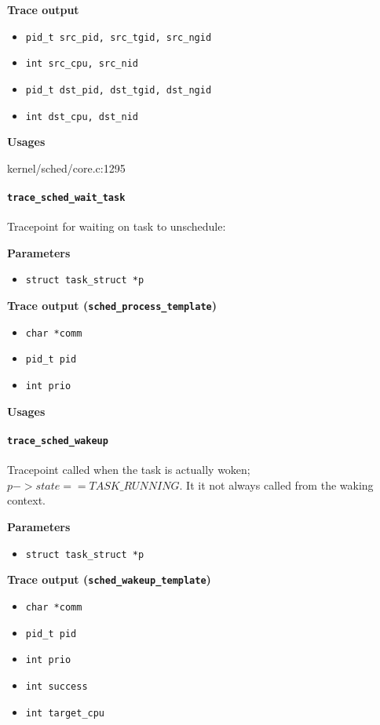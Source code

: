 \textbf{Trace output}
\begin{itemize}
    \item \verb|pid_t src_pid, src_tgid, src_ngid|
    \item \verb|int src_cpu, src_nid|
    \item \verb|pid_t dst_pid, dst_tgid, dst_ngid|
    \item \verb|int dst_cpu, dst_nid|
\end{itemize}

\textbf{Usages}
\begin{code}
kernel/sched/core.c:1295
\end{code}

\paragraph{\texttt{trace\_sched\_wait\_task}}
Tracepoint for waiting on task to unschedule:

\textbf{Parameters}
\begin{itemize}
    \item \verb|struct task_struct *p|
\end{itemize}

\textbf{Trace output (\texttt{sched\_process\_template})}
\begin{itemize}
    \item \verb|char *comm|
    \item \verb|pid_t pid|
    \item \verb|int prio|
\end{itemize}

\textbf{Usages}
\begin{code}

\end{code}

\paragraph{\texttt{trace\_sched\_wakeup}}
Tracepoint called when the task is actually woken; $p->state == TASK\_RUNNING$. It it not always called from the waking context.

\textbf{Parameters}
\begin{itemize}
    \item \verb|struct task_struct *p|
\end{itemize}

\textbf{Trace output (\texttt{sched\_wakeup\_template})}
\begin{itemize}
    \item \verb|char *comm|
    \item \verb|pid_t pid|
    \item \verb|int prio|
    \item \verb|int success|
    \item \verb|int target_cpu|
\end{itemize}

